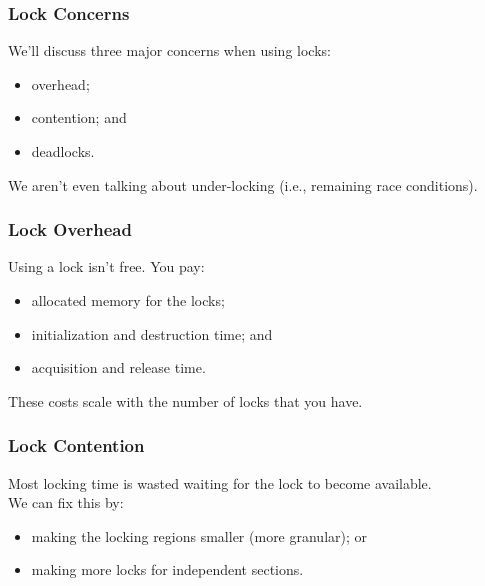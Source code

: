 \begin{frame}
\frametitle{Lock Concerns}

We'll discuss three major concerns when using locks:
  \begin{itemize}
    \item overhead;
    \item contention; and
    \item deadlocks.
  \end{itemize}
  
  
We aren't even talking about under-locking (i.e., remaining race conditions).

\end{frame}

\begin{frame}
\frametitle{Lock Overhead}

\begin{changemargin}{2cm}
  Using a lock isn't free. You pay:
  \begin{itemize}
    \item allocated memory for the locks;
    \item initialization and destruction time; and
    \item acquisition and release time.
  \end{itemize}


  These costs scale with the number of locks that you have.
\end{changemargin}
\end{frame}


\begin{frame}
\frametitle{Lock Contention}

\begin{changemargin}{1cm}
\vspace*{-3em}
 Most locking time is wasted waiting for the lock to become available.\\[1em]
We can fix this by:
\vspace*{-3em}
      \begin{itemize}
        \item making the locking regions smaller (more granular); or
        \item making more locks for independent sections.
      \end{itemize}
\end{changemargin}


\end{frame}

